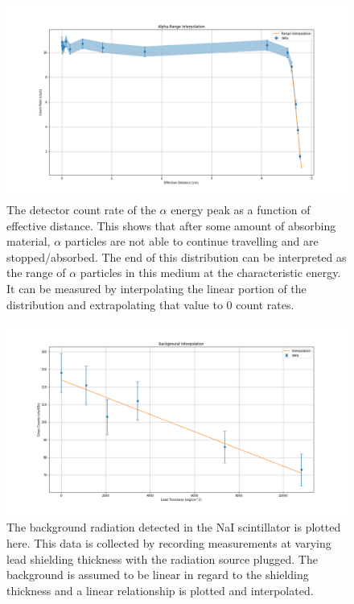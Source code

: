 \begin{figure}
\centering
\includegraphics[width=\textwidth]{count_rate.png}
\caption{The detector count rate of the $\alpha$ energy peak as a function of effective distance. This shows that after some amount of absorbing material, $\alpha$ particles are not able to continue travelling and are stopped/absorbed. The end of this distribution can be interpreted as the range of $\alpha$ particles in this medium at the characteristic energy. It can be measured by interpolating the linear portion of the distribution and extrapolating that value to 0 count rates.}
\label{fig:count-rate}
\end{figure}

\begin{figure}
\centering
\includegraphics[width=\textwidth]{background.png}
\caption{The background radiation detected in the NaI scintillator is plotted here. This data is collected by recording measurements at varying lead shielding thickness with the radiation source plugged. The background is assumed to be linear in regard to the shielding thickness and a linear relationship is plotted and interpolated.}
\label{fig:background}
\end{figure}

